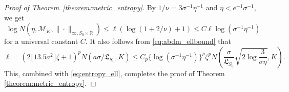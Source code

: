 \documentclass[11pt]{article}
\numberwithin{equation}{section}
\newcommand{\RS}{\mathbb{R}}
\newcommand{\lipsz}{\mathfrak{L}}
\begin{document}
\begin{appendices}
\begin{proof}[Proof of Theorem~\ref{theorem:metric_entropy}]
By $1/\nu = 3 \sigma^{-1} \eta^{-1}$ and $\eta < e^{-1} \sigma^{-1}$, we get
\begin{equation}\label{eq:entropy_ell}
\log N(\eta, \mathcal{M}_K, \| \cdot\|_{\infty, S_0 \times \RS}) \leq \ell (\log(1+2/\nu) + 1) \leq C \ell \log (\sigma^{-1} \eta^{-1})
\end{equation}
for a universal constant $C$. It also follows from \eqref{eq:abdm_ellbound} that
\begin{equation*}
  \ell = (2\lfloor 13.5 a^2\rfloor \zeta +1)^p N(a \sigma/\lipsz_{S_0},K) \leq C_p \{\log(\sigma^{-1}\eta^{-1})\}^p \zeta^p N \left(\frac{\sigma}{\lipsz_{S_0}} \sqrt{2 \log \frac{3}{\sigma \eta}},K \right). 
\end{equation*}
This, combined with \eqref{eq:entropy_ell}, completes the proof of Theorem \ref{theorem:metric_entropy}. 
\end{proof}

\end{appendices}
\end{document}
